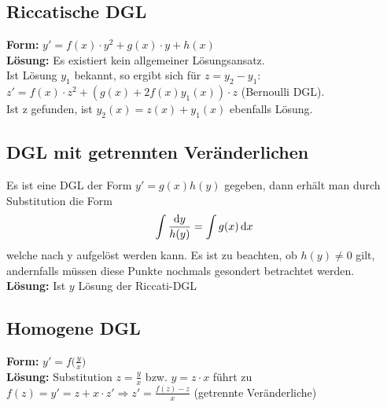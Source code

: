 \subsection{Riccatische DGL}
\textbf{Form:} $y' = f(x)\cdot y^2 + g(x) \cdot y + h(x)$\\
\textbf{Lösung:} Es existiert kein allgemeiner Lösungsansatz.\\
Ist Lösung $y_1$ bekannt, so ergibt sich für $z = y_2 - y_1$:\\
$z' = f(x)\cdot z^2 + (g(x) + 2f(x)y_1(x))\cdot z$ (Bernoulli DGL).\\
Ist z gefunden, ist $y_2(x) = z(x) + y_1(x)$ ebenfalls Lösung.

\subsection{DGL mit getrennten Veränderlichen}
Es ist eine DGL der Form $y'=g(x)h(y)$ gegeben, dann erhält man durch Substitution die Form
\begin{equation*}
    \int \frac{\mathop{}\!\mathrm{d} y}{h(y)} = \int g(x) \mathop{}\!\mathrm{d} x
\end{equation*}
welche nach y aufgelöst werden kann. Es ist zu beachten, ob $h(y)\neq0$ gilt, andernfalls müssen diese Punkte nochmals gesondert betrachtet werden.\\

\textbf{Lösung:} Ist $y$ Lösung der Riccati-DGL


\subsection{Homogene DGL}
\textbf{Form:} $y' = f\big( \frac{y}{x} \big)$\\
\textbf{Lösung:} Substitution $z = \frac{y}{x}$ bzw. $y = z\cdot x$ führt zu\\
$f(z) = y' = z + x\cdot z' \Rightarrow z' = \frac{f(z) - z}{x}$ (getrennte 
Veränderliche)

